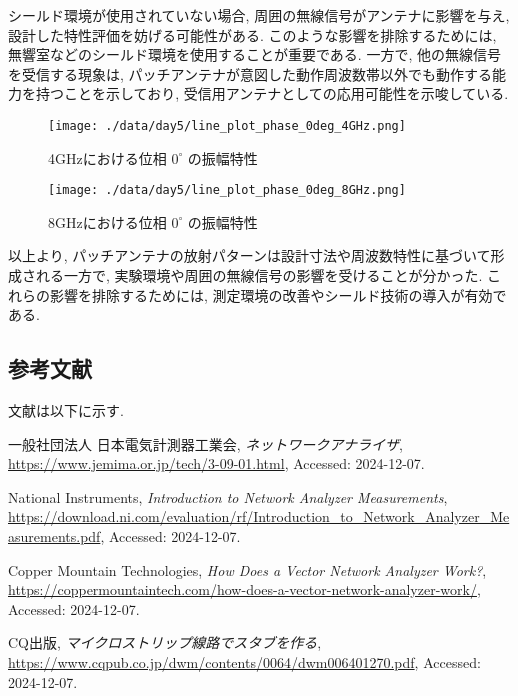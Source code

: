 \documentclass[a4paper, twocolumn]{article} %
\begin{document}
シールド環境が使用されていない場合, 周囲の無線信号がアンテナに影響を与え, 設計した特性評価を妨げる可能性がある. このような影響を排除するためには, 無響室などのシールド環境を使用することが重要である. 一方で, 他の無線信号を受信する現象は, パッチアンテナが意図した動作周波数帯以外でも動作する能力を持つことを示しており, 受信用アンテナとしての応用可能性を示唆している.

\begin{figure}[h]
    \centering
    \texttt{[image: ./data/day5/line\_plot\_phase\_0deg\_4GHz.png]}
    \caption{4GHzにおける位相 \(0^\circ\) の振幅特性}
    \label{fig:line_4GHz}
\end{figure}

\begin{figure}[h]
    \centering
    \texttt{[image: ./data/day5/line\_plot\_phase\_0deg\_8GHz.png]}
    \caption{8GHzにおける位相 \(0^\circ\) の振幅特性}
    \label{fig:line_8GHz}
\end{figure}

以上より, パッチアンテナの放射パターンは設計寸法や周波数特性に基づいて形成される一方で, 実験環境や周囲の無線信号の影響を受けることが分かった. これらの影響を排除するためには, 測定環境の改善やシールド技術の導入が有効である.

\subsection{参考文献}
文献は以下に示す.

\begin{thebibliography}{9}
  一般社団法人 日本電気計測器工業会,
  \textit{ネットワークアナライザ},
  \url{https://www.jemima.or.jp/tech/3-09-01.html},
  Accessed: 2024-12-07.

  National Instruments,
  \textit{Introduction to Network Analyzer Measurements},
  \url{https://download.ni.com/evaluation/rf/Introduction_to_Network_Analyzer_Measurements.pdf},
  Accessed: 2024-12-07.

  Copper Mountain Technologies,
  \textit{How Does a Vector Network Analyzer Work?},
  \url{https://coppermountaintech.com/how-does-a-vector-network-analyzer-work/},
  Accessed: 2024-12-07.

  CQ出版,
  \textit{マイクロストリップ線路でスタブを作る},
  \url{https://www.cqpub.co.jp/dwm/contents/0064/dwm006401270.pdf},
  Accessed: 2024-12-07.
\end{thebibliography}
\end{document}
